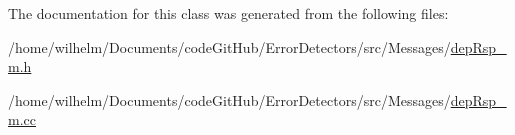 The documentation for this class was generated from the following files\+:\begin{DoxyCompactItemize}
\item 
/home/wilhelm/\+Documents/code\+Git\+Hub/\+Error\+Detectors/src/\+Messages/\hyperlink{dep_rsp__m_8h}{dep\+Rsp\+\_\+m.\+h}\item 
/home/wilhelm/\+Documents/code\+Git\+Hub/\+Error\+Detectors/src/\+Messages/\hyperlink{dep_rsp__m_8cc}{dep\+Rsp\+\_\+m.\+cc}\end{DoxyCompactItemize}
